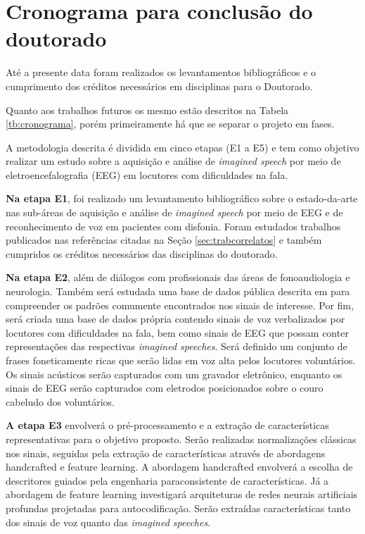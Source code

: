 \documentclass[a4paper,12pt,openright,oneside]{book}
\newenvironment{myenv}[1]
  {\begin{spacing}{#1}}
  {\end{spacing}}
\begin{document}
	\chapter{Cronograma para conclusão do doutorado}
		\label{ch:cronograma}
		\begin{myenv}{1.5}
			\par Até a presente data foram realizados os levantamentos bibliográficos e o cumprimento dos créditos necessários em disciplinas para o Doutorado.
			\par Quanto aos trabalhos futuros os mesmo estão descritos na Tabela \ref{tb:cronograma}, porém primeiramente há que se separar o projeto em fases.
			
			\par A metodologia descrita é dividida em cinco etapas (E1 a E5) e tem como objetivo realizar um estudo sobre a aquisição e análise de \textit{imagined speech} por meio de eletroencefalografia (EEG) em locutores com dificuldades na fala.\newline
			
			\par \textbf{Na etapa E1}, foi realizado um levantamento bibliográfico sobre o estado-da-arte nas sub-áreas de aquisição e análise de \textit{imagined speech} por meio de EEG e de reconhecimento de voz em pacientes com disfonia. Foram estudados trabalhos publicados nas referências citadas na Seção \ref{sec:trabcorrelatos} e também cumpridos os créditos necessários das disciplinas do doutorado.\newline
			
			\par \textbf{Na etapa E2}, além de diálogos com profissionais das áreas de fonoaudiologia e neurologia. Também será estudada uma base de dados pública descrita em \cite{10.1117/12.2255697} para compreender os padrões comumente encontrados nos sinais de interesse. Por fim, será criada uma base de dados própria contendo sinais de voz verbalizados por locutores com dificuldades na fala, bem como sinais de EEG que possam conter representações das respectivas \textit{imagined speeches}. Será definido um conjunto de frases foneticamente ricas que serão lidas em voz alta pelos locutores voluntários. Os sinais acústicos serão capturados com um gravador eletrônico, enquanto os sinais de EEG serão capturados com eletrodos posicionados sobre o couro cabeludo dos voluntários.\newline
			
			\par \textbf{A etapa E3} envolverá o pré-processamento e a extração de características representativas para o objetivo proposto. Serão realizadas normalizações clássicas nos sinais, seguidas pela extração de características através de abordagens handcrafted e feature learning. A abordagem handcrafted envolverá a escolha de descritores guiados pela engenharia paraconsistente de características. Já a abordagem de feature learning investigará arquiteturas de redes neurais artificiais profundas projetadas para autocodificação. Serão extraídas características tanto dos sinais de voz quanto das \textit{imagined speeches}.\newline
			

\end{myenv}
\end{document}
